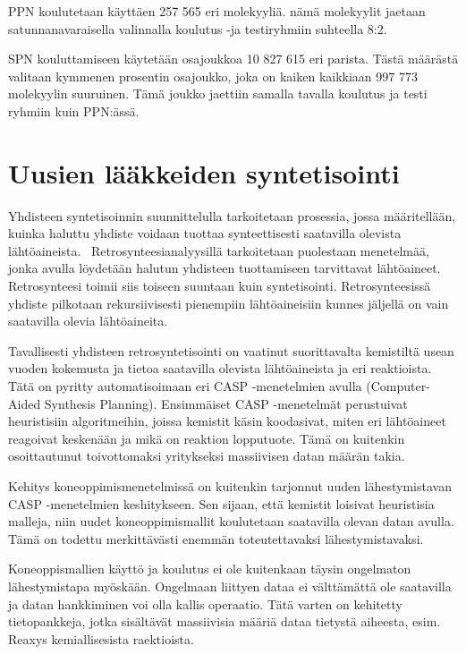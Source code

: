 \documentclass[finnish,twoside,censored,subject,sw-line]{HYthesisML}
\begin{document}
PPN koulutetaan käyttäen 257 565 eri molekyyliä.
nämä molekyylit jaetaan satunnanavaraisella valinnalla koulutus -ja testiryhmiin suhteella 8:2.

SPN kouluttamiseen käytetään osajoukkoa 10 827 615 eri parista.
Tästä määrästä valitaan kymmenen prosentin osajoukko, joka on kaiken kaikkiaan 997 773 molekyylin suuruinen.
Tämä joukko jaettiin samalla tavalla koulutus ja testi ryhmiin kuin PPN:ässä.

\chapter{Uusien lääkkeiden syntetisointi}

Yhdisteen syntetisoinnin suunnittelulla tarkoitetaan prosessia, jossa määritellään, kuinka haluttu yhdiste voidaan tuottaa synteettisesti saatavilla olevista lähtöaineista.~\cite{ColeyConnorW2018MLiC}
Retrosynteesianalyysillä tarkoitetaan puolestaan menetelmää, jonka avulla löydetään halutun yhdisteen tuottamiseen tarvittavat lähtöaineet.
Retrosynteesi toimii siis toiseen suuntaan kuin syntetisointi.
Retrosynteesissä yhdiste pilkotaan rekursiivisesti pienempiin lähtöaineisiin kunnes jäljellä on vain saatavilla olevia lähtöaineita.

Tavallisesti yhdisteen retrosyntetisointi on vaatinut suorittavalta kemistiltä usean vuoden kokemusta ja tietoa saatavilla olevista lähtöaineista ja eri reaktioista.
Tätä on pyritty automatisoimaan eri CASP -menetelmien avulla (Computer-Aided Synthesis Planning).
Ensimmäiset CASP -menetelmät perustuivat heuristisiin algoritmeihin, joissa kemistit käsin koodasivat, miten eri lähtöaineet reagoivat keskenään ja mikä on reaktion lopputuote.
Tämä on kuitenkin osoittautunut toivottomaksi yritykseksi massiivisen datan määrän takia.

Kehitys koneoppimismenetelmissä on kuitenkin tarjonnut uuden lähestymistavan CASP -menetelmien keshitykseen.
Sen sijaan, että kemistit loisivat heuristisia malleja, niin uudet koneoppimismallit koulutetaan saatavilla olevan datan avulla.
Tämä on todettu merkittävästi enemmän toteutettavaksi lähestymistavaksi.

Koneoppismallien käyttö ja koulutus ei ole kuitenkaan täysin ongelmaton lähestymistapa myöskään.
Ongelmaan liittyen dataa ei välttämättä ole saatavilla ja datan hankkiminen voi olla kallis operaatio.
Tätä varten on kehitetty tietopankkeja, jotka sisältävät massiivisia määriä dataa tietystä aiheesta, esim. Reaxys kemiallisesista raektioista.
\end{document}

